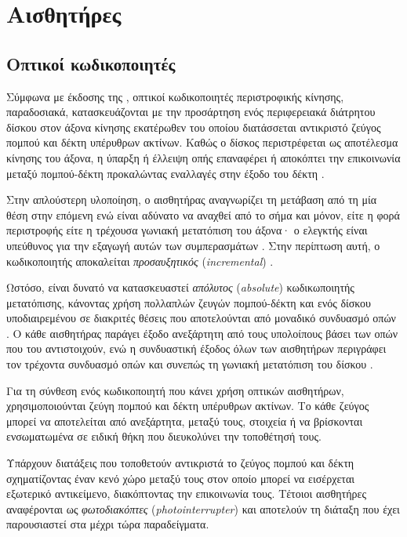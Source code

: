 \chapter{Αισθητήρες}

\section{Οπτικοί κωδικοποιητές}

Σύμφωνα με έκδοσης της \textcite[12]{drc76}, οπτικοί κωδικοποιητές περιστροφικής
κίνησης, παραδοσιακά, κατασκευάζονται με την προσάρτηση ενός περιφερειακά
διάτρητου δίσκου στον άξονα κίνησης εκατέρωθεν του οποίου διατάσσεται αντικριστό
ζεύγος πομπού και δέκτη υπέρυθρων ακτίνων. Καθώς ο δίσκος περιστρέφεται ως
αποτέλεσμα κίνησης του άξονα, η ύπαρξη ή έλλειψη οπής επαναφέρει ή αποκόπτει την
επικοινωνία μεταξύ πομπού-δέκτη προκαλώντας εναλλαγές στην έξοδο του δέκτη
\parencite[12]{drc76}.

Στην απλούστερη υλοποίηση, ο αισθητήρας αναγνωρίζει τη μετάβαση από τη μία θέση
στην επόμενη ενώ είναι αδύνατο να αναχθεί από το σήμα και μόνον, είτε η φορά
περιστροφής είτε η τρέχουσα γωνιακή μετατόπιση του άξονα· ο ελεγκτής είναι
υπεύθυνος για την εξαγωγή αυτών των συμπερασμάτων \parencites[5--6]{lynch02}
[13]{drc76}. Στην περίπτωση αυτή, ο κωδικοποιητής αποκαλείται
\emph{προσαυξητικός} (\emph{incremental})
\parencite[5]{lynch02}.

Ωστόσο, είναι δυνατό να κατασκευαστεί \emph{απόλυτος} (\emph{absolute})
κωδικωποιητής μετατόπισης, κάνοντας
χρήση πολλαπλών ζευγών πομπού-δέκτη και ενός δίσκου υποδιαιρεμένου σε διακριτές
θέσεις που αποτελούνται από μοναδικό συνδυασμό οπών \parencites[6]{lynch02}. Ο
κάθε αισθητήρας παράγει έξοδο ανεξάρτητη από τους υπολοίπους βάσει των οπών που
του αντιστοιχούν, ενώ η συνδυαστική έξοδος όλων των αισθητήρων περιγράφει τον
τρέχοντα συνδυασμό οπών και συνεπώς τη γωνιακή μετατόπιση του δίσκου
\parencites[6]{lynch02}.

Για τη σύνθεση ενός κωδικοποιητή που κάνει χρήση οπτικών αισθητήρων,
χρησιμοποιούνται ζεύγη πομπού και δέκτη υπέρυθρων ακτίνων. Το κάθε ζεύγος μπορεί
να αποτελείται από ανεξάρτητα, μεταξύ τους, στοιχεία ή να βρίσκονται
ενσωματωμένα σε ειδική θήκη που διευκολύνει την τοποθέτησή τους.

Υπάρχουν διατάξεις που τοποθετούν αντικριστά το ζεύγος πομπού και δέκτη
σχηματίζοντας έναν κενό χώρο μεταξύ τους στον οποίο μπορεί να εισέρχεται
εξωτερικό αντικείμενο, διακόπτοντας την επικοινωνία τους. Τέτοιοι αισθητήρες
αναφέρονται ως \emph{φωτοδιακόπτες}
(\emph{photointerrupter}) \parencite[3]{lynch02} και αποτελούν τη διάταξη που
έχει παρουσιαστεί στα μέχρι τώρα παραδείγματα.

